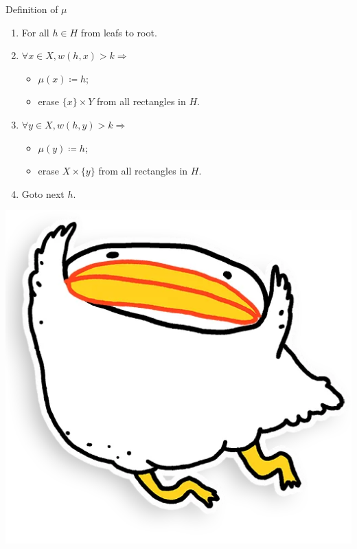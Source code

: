 \begin{frame}{Definition of $\mu$}

    \begin{minipage}{0.6\linewidth}
        \begin{enumerate}
            \item For all $h \in H$ from leafs to root.
                \pause
            \item $\forall x \in X, w(h, x) > k \Rightarrow$
                \begin{itemize}
                    \item $\mu(x) \coloneqq h$;
                    \item erase $\{x\} \times Y$ from \alert{all} rectangles in $H$.
                \end{itemize}
            \item $\forall y \in X, w(h, y) > k \Rightarrow$
                \begin{itemize}
                    \item $\mu(y) \coloneqq h$;
                    \item erase $X \times \{y\}$ from \alert{all} rectangles in $H$.
                \end{itemize}
                \pause
            \item Goto next $h$.
        \end{enumerate}
    \end{minipage}    
    \begin{minipage}{0.36\linewidth}
        \centering
        \includegraphics[scale = 0.1]{pics/utia-fly.png}
    \end{minipage}


\end{frame}
